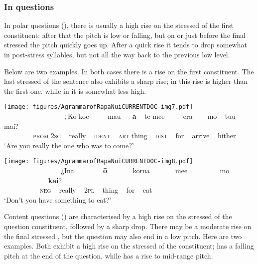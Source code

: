 \subsubsection{In questions}\label{sec:2.4.2.2}

In polar questions (), there is usually a high rise on the stressed  of the first constituent; after that the pitch is low or falling, but on or just before the final stressed  the pitch quickly goes up. After a quick rise it tends to drop somewhat in post-stress syllables, but not all the way back to the previous low level. 

Below are two examples. In both cases there is a rise on the first constituent. The last stressed  of the sentence also exhibits a sharp rise; in  this rise is higher than the first one, while in  it is somewhat less high. 

 
\ea\label{ex:2.10}
\texttt{[image: figures/AgrammarofRapaNuiCURRENTDOC-img7.pdf]}\\
\gll ~ ~ ~ ~ ~~~~~~~~~~ ¿Ko koe ~~~~ mau ~~ \textbf{{\ꞌ}ā} ~ te  me{\ꞌ}e ~~~~ era ~~~ mo ~ tu{\ꞌ}u ~ mai? \\
 ~ ~ ~ ~ ~ \textsc{prom} \textsc{2sg} ~ really ~ \textsc{ident} ~ \textsc{art}  thing ~ \textsc{dist} ~ for ~ arrive ~ hither \\

\glt 
‘Are you really the one who was to come?’ \textstyleExampleref{[R630-05.019]}
\z


\ea\label{ex:2.11}
\texttt{[image: figures/AgrammarofRapaNuiCURRENTDOC-img8.pdf]}\\
\gll ~ ~ ~ ~ ~~~~~~~~~ ¿{\ꞌ}Ina ~~~~~~~ \textbf{{\ꞌ}ō} ~~~~~~ kōrua ~~~~~~ me{\ꞌ}e ~~~~~~~~ mo ~~~~~~~~~~~~ \textbf{kai}? \\
 ~ ~ ~ ~ ~ ~~\textsc{neg} ~ really ~ \textsc{2pl} ~ thing ~ for ~ eat \\

\glt 
‘Don’t you have something to eat?’ \textstyleExampleref{[R630-15.041]}
\z

Content questions () are characterised by a high rise on the stressed  of the question constituent, followed by a sharp drop. There may be a moderate rise on the final stressed , but the question may also end in a low pitch. Here are two examples. Both exhibit a high rise on the stressed  of the  constituent;  has a falling pitch at the end of the question, while  has a rise to mid-range pitch.


